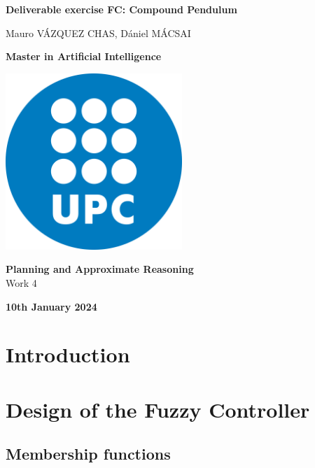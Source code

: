 \documentclass[12pt]{article}
\begin{document}
\begin{titlepage}
    \centering
    \vspace*{3cm}
    {\Huge\bfseries Deliverable exercise FC: Compound Pendulum\par}
    \vspace{1cm}
    {\large Mauro VÁZQUEZ CHAS, Dániel MÁCSAI \par}
    \vspace{4cm}
    {\large \textbf{Master in Artificial Intelligence}\par}
    \includegraphics[width=0.5\textwidth]{Logo_UPC.png}\par\vspace{1cm}
    {\large \textbf{Planning and Approximate Reasoning}\\ Work 4\par}
    \vspace{1cm}
    {\large\bfseries 10th January 2024\par}
\end{titlepage}

\pagestyle{empty}

\newpage
\tableofcontents
\newpage

\setcounter{page}{1}
\pagestyle{plain}

\section{Introduction}
\label{sec:introduction}

\section{Design of the Fuzzy Controller}
\label{sec:desig}

\subsection{Membership functions}
\end{document}
